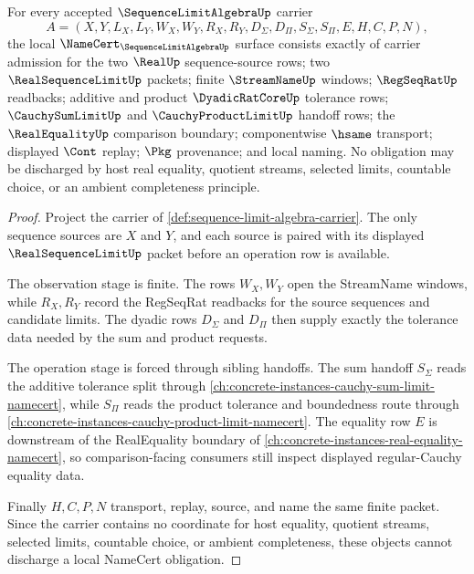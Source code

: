 \begin{theorem}
\label{thm:sequence-limit-algebra-namecert-obligations}
For every accepted $\SequenceLimitAlgebraUp$ carrier
$$
A=(X,Y,L_X,L_Y,W_X,W_Y,R_X,R_Y,D_{\Sigma},D_{\Pi},S_{\Sigma},S_{\Pi},E,H,C,P,N),
$$
the local $\NameCert_{\SequenceLimitAlgebraUp}$ surface consists exactly of carrier admission for the two $\RealUp$ sequence-source rows; two $\RealSequenceLimitUp$ packets; finite $\StreamNameUp$ windows; $\RegSeqRatUp$ readbacks; additive and product $\DyadicRatCoreUp$ tolerance rows; $\CauchySumLimitUp$ and $\CauchyProductLimitUp$ handoff rows; the $\RealEqualityUp$ comparison boundary; componentwise $\hsame$ transport; displayed $\Cont$ replay; $\Pkg$ provenance; and local naming. No obligation may be discharged by host real equality, quotient streams, selected limits, countable choice, or an ambient completeness principle.
\end{theorem}
\begin{proof}
Project the carrier of \autoref{def:sequence-limit-algebra-carrier}. The only sequence sources are $X$ and $Y$, and each source is paired with its displayed $\RealSequenceLimitUp$ packet before an operation row is available.

The observation stage is finite. The rows $W_X,W_Y$ open the StreamName windows, while $R_X,R_Y$ record the RegSeqRat readbacks for the source sequences and candidate limits. The dyadic rows $D_{\Sigma}$ and $D_{\Pi}$ then supply exactly the tolerance data needed by the sum and product requests.

The operation stage is forced through sibling handoffs. The sum handoff $S_{\Sigma}$ reads the additive tolerance split through \autoref{ch:concrete-instances-cauchy-sum-limit-namecert}, while $S_{\Pi}$ reads the product tolerance and boundedness route through \autoref{ch:concrete-instances-cauchy-product-limit-namecert}. The equality row $E$ is downstream of the RealEquality boundary of \autoref{ch:concrete-instances-real-equality-namecert}, so comparison-facing consumers still inspect displayed regular-Cauchy equality data.

Finally $H,C,P,N$ transport, replay, source, and name the same finite packet. Since the carrier contains no coordinate for host equality, quotient streams, selected limits, countable choice, or ambient completeness, these objects cannot discharge a local NameCert obligation.
\end{proof}

